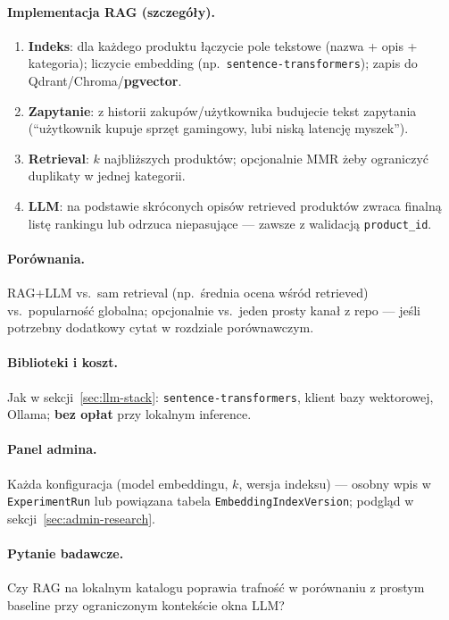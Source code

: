 \documentclass[a4paper,11pt]{article}
\newcommand{\code}[1]{\texttt{\small #1}}
\begin{document}
\paragraph{Implementacja RAG (szczegóły).}
\begin{enumerate}[leftmargin=1.5em,itemsep=1pt]
  \item \textbf{Indeks}: dla każdego produktu łączycie pole tekstowe (nazwa + opis + kategoria); liczycie embedding (np.\ \code{sentence-transformers}); zapis do Qdrant/Chroma/\textbf{pgvector}.
  \item \textbf{Zapytanie}: z historii zakupów/użytkownika budujecie tekst zapytania (``użytkownik kupuje sprzęt gamingowy, lubi niską latencję myszek'').
  \item \textbf{Retrieval}: $k$ najbliższych produktów; opcjonalnie MMR żeby ograniczyć duplikaty w jednej kategorii.
  \item \textbf{LLM}: na podstawie skróconych opisów retrieved produktów zwraca finalną listę rankingu lub odrzuca niepasujące --- zawsze z walidacją \code{product\_id}.
\end{enumerate}

\paragraph{Porównania.}
RAG+LLM vs.\ sam retrieval (np.\ średnia ocena wśród retrieved) vs.\ popularność globalna; opcjonalnie vs.\ jeden prosty kanał z repo --- jeśli potrzebny dodatkowy cytat w rozdziale porównawczym.

\paragraph{Biblioteki i koszt.}
Jak w sekcji~\ref{sec:llm-stack}: \code{sentence-transformers}, klient bazy wektorowej, Ollama; \textbf{bez opłat} przy lokalnym inference.

\paragraph{Panel admina.}
Każda konfiguracja (model embeddingu, $k$, wersja indeksu) --- osobny wpis w \code{ExperimentRun} lub powiązana tabela \code{EmbeddingIndexVersion}; podgląd w sekcji~\ref{sec:admin-research}.

\paragraph{Pytanie badawcze.}
Czy RAG na lokalnym katalogu poprawia trafność w porównaniu z prostym baseline przy ograniczonym kontekście okna LLM?
\end{document}
